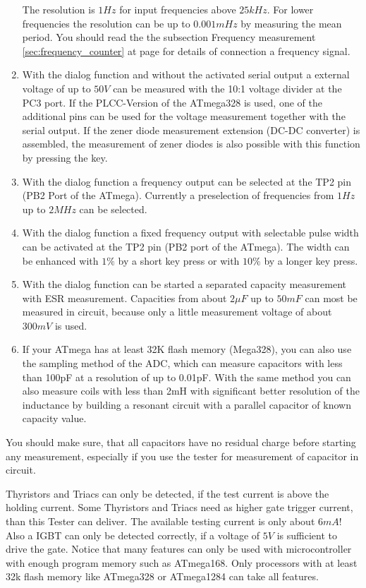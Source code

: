 \begin{enumerate}
The resolution is \(1Hz\) for input frequencies above \(25kHz\).
For lower frequencies the resolution can be up to \(0.001mHz\) by measuring the mean period.
You should read the the subsection Frequency measurement \ref{sec:frequency_counter} at page \pageref{sec:frequency_counter} 
for details of connection a frequency signal.
\item With the dialog function and without the activated serial output a external voltage of up to \(50V\) can be measured with
the 10:1 voltage divider at the PC3 port. If the PLCC-Version of the ATmega328 is used, one of the additional
pins can be used for the voltage measurement together with the serial output.
If the zener diode measurement extension (DC-DC converter) is assembled, the measurement of
zener diodes is also possible with this function by pressing the key.
\item With the dialog function a frequency output can be selected at the TP2 pin (PB2 Port of the ATmega).
Currently a preselection of frequencies from \(1Hz\) up to \(2MHz\) can be selected.
\item With the dialog function a fixed frequency output with selectable pulse width can be activated at the TP2 pin
(PB2 port of the ATmega). The width can be enhanced with \(1\%\) by a short key press or with \(10\%\) by a longer key press.
\item With the dialog function can be started a separated capacity measurement with ESR measurement.
Capacities from about \(2\mu F\) up to \(50mF\) can most be measured in circuit, because only a little
measurement voltage of about \(300mV\) is used.
\item If your ATmega has at least 32K flash memory (Mega328), you can also use the sampling method of the ADC,
which can measure capacitors with less than 100pF at a resolution of up to 0.01pF.
With the same method you can also measure coils with less than 2mH with significant better resolution of the inductance
by building a resonant circuit with a parallel capacitor of known capacity value.

\end{enumerate}

You should make sure, that all capacitors have no residual charge before starting any measurement,
especially if you use the tester for measurement of capacitor in circuit.


Thyristors and Triacs can only be detected, if the test current is above the holding current.
Some Thyristors and Triacs need as higher gate trigger current, than this Tester can deliver.
The available testing current is only about \(6mA\)!
Also a IGBT can only be detected correctly, if a voltage of \(5V\) is sufficient to drive the gate.
Notice that many features can only be used with microcontroller with enough program memory such as ATmega168.
Only processors with at least 32k flash memory like ATmega328 or ATmega1284 can take all features.

